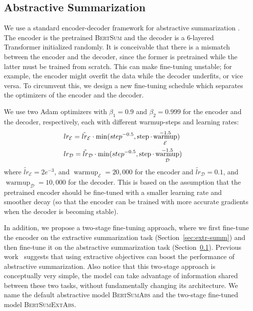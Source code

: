 \documentclass[11pt,a4paper]{article}
\DeclareMathOperator\step{\operatorname{step}}
\DeclareMathOperator\warmup{\operatorname{warmup}}
\begin{document}
    
    
    \subsection{Abstractive Summarization}
    \label{sec:abstr-summ}
    
    We use a standard encoder-decoder framework for abstractive
    summarization \cite{see-acl17}. The encoder is the pretrained
    \textsc{BertSum} and the decoder is a 6-layered Transformer
    initialized randomly.  It is conceivable that there is a mismatch
    between the encoder and the decoder, since the former is pretrained
    while the latter must be trained from scratch. This can make
    fine-tuning unstable; for example, the encoder might overfit the data
    while the decoder underfits, or vice versa.  To circumvent this, we
    design a new fine-tuning schedule which separates the optimizers of
    the encoder and the decoder.
    
    
    We use two Adam optimizers with $\beta_1=0.9$ and
    $\beta_2=0.999$ for the encoder and the decoder, respectively, each
    with different warmup-steps and learning rates:
    \begin{align}
    &\hspace*{-.4cm}lr_{\mathcal{E}} = \tilde{lr}_{\mathcal{E}}\cdot \min(step^{-0.5}, \step \cdot \warmup_{\mathcal{E}}^{-1.5})\\
    &\hspace*{-.4cm}lr_{\mathcal{D}} = \tilde{lr}_{\mathcal{D}}\cdot \min(step^{-0.5}, \step \cdot \warmup_{\mathcal{D}}^{-1.5})
    \end{align}
    where $\tilde{lr}_{\mathcal{E}}=2e^{-3}$, and
    $\warmup_{\mathcal{E}}=20,000$ for the encoder and
    $\tilde{lr}_{\mathcal{D}}=0.1$, and $\warmup_{\mathcal{D}}=10,000$ for
    the decoder. This is based on the assumption that the pretrained
    encoder should be fine-tuned with a smaller learning rate and smoother
    decay (so that  the encoder can be trained with more accurate gradients when the decoder is becoming stable).
    
    In addition, we propose a two-stage fine-tuning approach, where we
    first fine-tune the encoder on the extractive summarization task
    (Section~\ref{sec:extr-summ}) and then fine-tune it on the abstractive
    summarization task (Section~\ref{sec:abstr-summ}). Previous
    work~\cite{gehrmann2018bottom,li2018improving} suggests that using
    extractive objectives can boost the performance of abstractive
    summarization. Also notice that this two-stage approach is
    conceptually very simple, the model can take advantage of information
    shared between these two tasks, without fundamentally changing its
    architecture.  We name the default abstractive model
    \textsc{BertSumAbs} and the two-stage fine-tuned model
    \textsc{BertSumExtAbs}.
    
\end{document}

